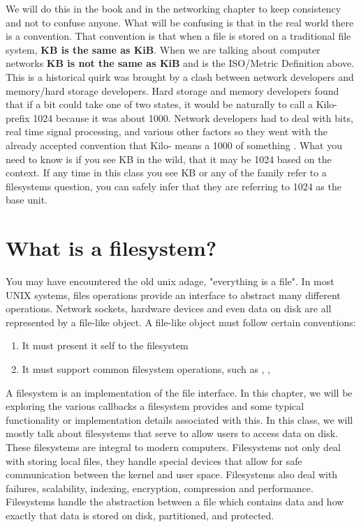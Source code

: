 We will do this in the book and in the networking chapter to keep consistency and not to confuse anyone.
What will be confusing is that in the real world there is a convention.
That convention is that when a file is stored on a traditional file system, \textbf{KB is the same as KiB}.
When we are talking about computer networks \textbf{KB is not the same as KiB} and is the ISO/Metric Definition above.
This is a historical quirk was brought by a clash between network developers and memory/hard storage developers.
Hard storage and memory developers found that if a bit could take one of two states, it would be naturally to call a Kilo- prefix 1024 because it was about 1000.
Network developers had to deal with bits, real time signal processing, and various other factors so they went with the already accepted convention that Kilo- means a 1000 of something .
What you need to know is if you see KB in the wild, that it may be 1024 based on the context.
If any time in this class you see KB or any of the family refer to a filesystems question, you can safely infer that they are referring to 1024 as the base unit.

\section{What is a filesystem?}

You may have encountered the old unix adage, "everything is a file". In most UNIX systems, files operations provide an interface to abstract many different operations. Network sockets, hardware devices and even data on disk are all represented by a file-like object. A file-like object must follow certain conventions:

\begin{enumerate}
  \item It must present it self to the filesystem
  \item It must support common filesystem operations, such as , , 
\end{enumerate}

A filesystem is an implementation of the file interface. In this chapter, we will be exploring the various callbacks a filesystem provides and some typical functionality or implementation details associated with this. In this class, we will mostly talk about filesystems that serve to allow users to access data on disk. These filesystems are integral to modern computers. Filesystems not only deal with storing local files, they handle special devices that allow for safe communication between the kernel and user space. Filesystems also deal with failures, scalability, indexing, encryption, compression and performance. Filesystems handle the abstraction between a file which contains data and how exactly that data is stored on disk, partitioned, and protected.

